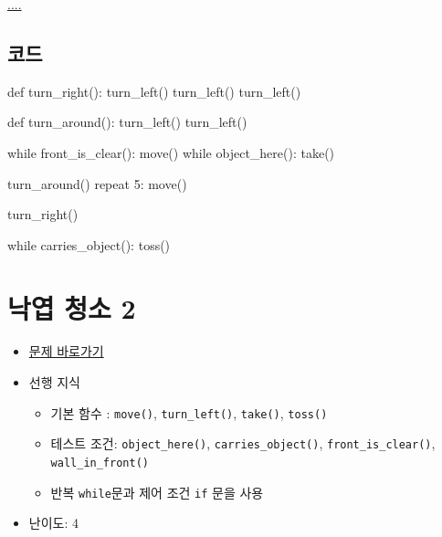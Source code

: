 \documentclass[
  b5paperpaper,
  DIV=11,
  numbers=noendperiod]{scrreprt}
\newenvironment{Shaded}{\begin{snugshade}}{\end{snugshade}}
\newcommand{\ControlFlowTok}[1]{\textcolor[rgb]{0.00,0.23,0.31}{#1}}
\newcommand{\DecValTok}[1]{\textcolor[rgb]{0.68,0.00,0.00}{#1}}
\newcommand{\KeywordTok}[1]{\textcolor[rgb]{0.00,0.23,0.31}{#1}}
\newcommand{\NormalTok}[1]{\textcolor[rgb]{0.00,0.23,0.31}{#1}}
\providecommand{\tightlist}{%
  \setlength{\itemsep}{0pt}\setlength{\parskip}{0pt}}\usepackage{longtable,booktabs,array}
\begin{document}
\url{....}

\hypertarget{uxcf54uxb4dc-28}{%
\subsection{코드}\label{uxcf54uxb4dc-28}}

\begin{Shaded}
\begin{Highlighting}[]
\KeywordTok{def}\NormalTok{ turn\_right():}
\NormalTok{    turn\_left()}
\NormalTok{    turn\_left()}
\NormalTok{    turn\_left()}

\KeywordTok{def}\NormalTok{ turn\_around():}
\NormalTok{    turn\_left()}
\NormalTok{    turn\_left()}
    
\ControlFlowTok{while}\NormalTok{ front\_is\_clear():}
\NormalTok{    move()}
    \ControlFlowTok{while}\NormalTok{ object\_here():}
\NormalTok{        take()}

\NormalTok{turn\_around()}
\NormalTok{repeat }\DecValTok{5}\NormalTok{:}
\NormalTok{    move()}

\NormalTok{turn\_right()    }
    
\ControlFlowTok{while}\NormalTok{ carries\_object():}
\NormalTok{    toss() }
\end{Highlighting}
\end{Shaded}

\hypertarget{storm-02}{%
\section{낙엽 청소 2}\label{storm-02}}

\begin{itemize}
\tightlist
\item
  \href{https://reeborg.ca/reeborg.html?lang=ko-en\&mode=python\&menu=worlds\%2Fmenus\%2Freeborg_intro_en.json\&name=Storm\%201\&url=worlds\%2Ftutorial_en\%2Fstorm1.json}{문제
  바로가기}
\item
  선행 지식

  \begin{itemize}
  \tightlist
  \item
    기본 함수 : \texttt{move()}, \texttt{turn\_left()}, \texttt{take()},
    \texttt{toss()}
  \item
    테스트 조건: \texttt{object\_here()}, \texttt{carries\_object()},
    \texttt{front\_is\_clear()}, \texttt{wall\_in\_front()}
  \item
    반복 \texttt{while}문과 제어 조건 \texttt{if} 문을 사용
  \end{itemize}
\item
  난이도: 4
\end{itemize}
\end{document}
